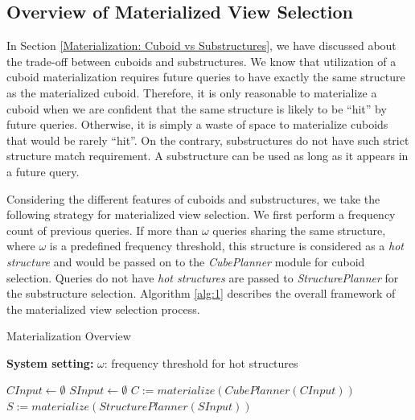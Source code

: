 \subsection{Overview of Materialized View Selection}
\label{Overview of Materialization Part}
In Section \ref{Materialization: Cuboid vs Substructures}, we have discussed about the trade-off between cuboids and substructures. We know that utilization of a cuboid materialization requires future queries to have exactly the same structure as the materialized cuboid. Therefore, it is only reasonable to materialize a cuboid %
when we are confident that the same structure is likely to be ``hit'' by future queries. Otherwise, it is simply a waste of space to materialize cuboids that would be rarely ``hit''. On the contrary, substructures do not have such strict structure match requirement. A substructure can be used as long as it appears in a future query. 

Considering the different features of cuboids and substructures, we take the following strategy for materialized view selection. 
We first perform a frequency count of previous queries. If more than $\omega$ queries sharing the same structure, where $\omega$ is a predefined frequency threshold, this structure is considered as a \emph{hot structure} and would be passed on to the \emph{CubePlanner} module for cuboid selection. Queries do not have \emph{hot structures} are passed to \emph{StructurePlanner} for the substructure selection. Algorithm \ref{alg:1} describes the overall framework of the materialized view selection process. 

\begin{algorithm}[H]
	\label{alg:1}
	\caption{Materialization Overview}
	\LinesNumbered
	\textbf{System setting:} $\omega$: frequency threshold for hot structures\\ 
	
	$CInput \gets \emptyset$\;
	$SInput \gets \emptyset$\;
	$C:=materialize(CubePlanner(CInput))$\;
	$S:=materialize(StructurePlanner(SInput))$\;
	\label{alg:PartialMaterialization}
\end{algorithm}

